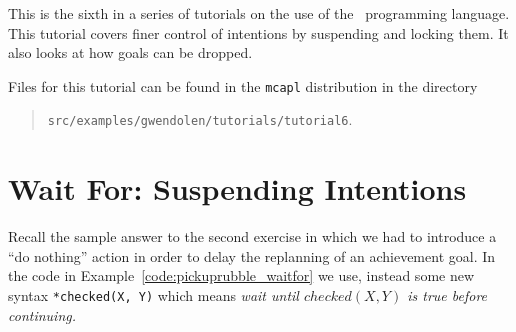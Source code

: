 
This is the sixth in a series of tutorials on the use of the \gwendolen\ programming language.  This tutorial covers finer control of intentions by suspending and locking them.  It also looks at how goals can be dropped.

Files for this tutorial can be found in the \texttt{mcapl} distribution in the directory 
\begin{quote}
\texttt{src/examples/gwendolen/tutorials/tutorial6}.
\end{quote}

\section{Wait For: Suspending Intentions}

Recall the sample answer to the second exercise  in which we had to introduce a ``do nothing'' action in order to delay the replanning of an achievement goal.  In the code in Example~\ref{code:pickuprubble_waitfor} we use, instead some new syntax \lstinline{*checked(X, Y)} which means \emph{wait until $checked(X, Y)$ is true before continuing.}

